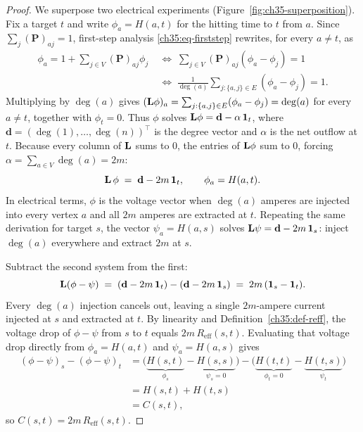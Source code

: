 \begin{proof}
We superpose two electrical experiments (Figure~\ref{fig:ch35-superposition}). Fix a target $t$ and write $\phi_a=H(a,t)$ for the hitting time to $t$ from $a$. Since $\sum_j(\mathbf{P})_{aj}=1$, first-step analysis \eqref{ch35:eq-firststep} rewrites, for every $a\ne t$, as
\begin{align*}
  \phi_a = 1+\sum_{j\in V} (\mathbf{P})_{aj}\phi_j
  &\;\Longleftrightarrow\; \sum_{j\in V} (\mathbf{P})_{aj}(\phi_a-\phi_j) = 1 \\
  &\;\Longleftrightarrow\; \frac{1}{\deg(a)}\sum_{j:\{a,j\}\in E}(\phi_a-\phi_j) = 1.
\end{align*}
Multiplying by $\deg(a)$ gives $(\mathbf{L}\phi)_a = \sum_{j:\{a,j\}\in E}(\phi_a-\phi_j)=\deg(a)$ for every $a\ne t$, together with $\phi_t=0$. Thus $\phi$ solves $\mathbf{L}\phi=\mathbf{d}-\alpha\,\mathbf{1}_t$, where $\mathbf{d}=(\deg(1),\dots,\deg(n))^\top$ is the degree vector and $\alpha$ is the net outflow at $t$. Because every column of $\mathbf{L}$ sums to $0$, the entries of $\mathbf{L}\phi$ sum to $0$, forcing $\alpha=\sum_{a\in V}\deg(a)=2m$:
\[
  \mathbf{L}\,\phi \;=\; \mathbf{d}-2m\,\mathbf{1}_t,
  \qquad \phi_a=H(a,t).
\]
In electrical terms, $\phi$ is the voltage vector when $\deg(a)$ amperes are injected into every vertex $a$ and all $2m$ amperes are extracted at $t$. Repeating the same derivation for target $s$, the vector $\psi_a=H(a,s)$ solves $\mathbf{L}\psi=\mathbf{d}-2m\,\mathbf{1}_s$: inject $\deg(a)$ everywhere and extract $2m$ at $s$.

Subtract the second system from the first:
\[
  \mathbf{L}(\phi-\psi) \;=\; (\mathbf{d}-2m\,\mathbf{1}_t) - (\mathbf{d}-2m\,\mathbf{1}_s) \;=\; 2m\,(\mathbf{1}_s-\mathbf{1}_t).
\]
Every $\deg(a)$ injection cancels out, leaving a single $2m$-ampere current injected at $s$ and extracted at $t$. By linearity and Definition~\ref{ch35:def-reff}, the voltage drop of $\phi-\psi$ from $s$ to $t$ equals $2m\,R_{\mathrm{eff}}(s,t)$. Evaluating that voltage drop directly from $\phi_a=H(a,t)$ and $\psi_a=H(a,s)$ gives
\begin{align*}
  (\phi-\psi)_s-(\phi-\psi)_t
  &= \bigl(\underbrace{H(s,t)}_{\phi_s}-\underbrace{H(s,s)}_{\psi_s=0}\bigr)
   -\bigl(\underbrace{H(t,t)}_{\phi_t=0}-\underbrace{H(t,s)}_{\psi_t}\bigr) \\
  &= H(s,t)+H(t,s) \\
  &= C(s,t),
\end{align*}
so $C(s,t)=2m\,R_{\mathrm{eff}}(s,t)$.
\end{proof}


